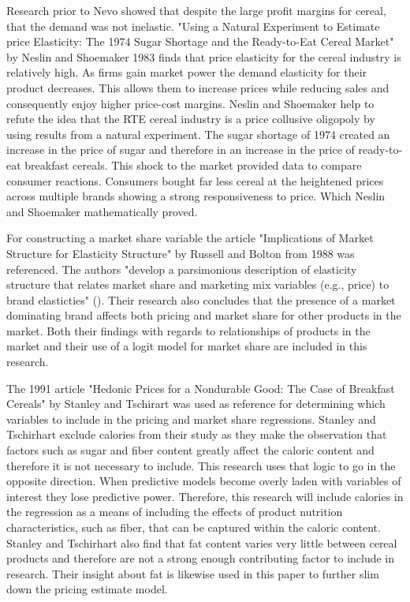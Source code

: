 \documentclass[12pt,english]{article}
\begin{document}
\tab Research prior to Nevo showed that despite the large profit margins for cereal, that the demand was not inelastic. "Using a Natural Experiment to Estimate price Elasticity: The 1974 Sugar Shortage and the Ready-to-Eat Cereal Market" by Neslin and Shoemaker 1983 finds that price elasticity for the cereal industry is relatively high. As firms gain market power the demand elasticity for their product decreases. This allows them to increase prices while reducing sales and consequently enjoy higher price-cost margins. Neslin and Shoemaker help to refute the idea that the RTE cereal industry is a price collusive oligopoly by using results from a natural experiment. The sugar shortage of 1974 created an increase in the price of sugar and therefore in an increase in the price of ready-to-eat breakfast cereals. This shock to the market provided data to compare consumer reactions. Consumers bought far less cereal at the heightened prices across multiple brands showing a strong responsiveness to price. Which Neslin and Shoemaker mathematically proved. 

\tab For constructing a market share variable the article "Implications of Market Structure for Elasticity Structure" by Russell and Bolton from 1988 was referenced. The authors "develop a parsimonious description of elasticity structure that relates market share and marketing mix variables (e.g., price) to brand elasticties" (\cite{RussellandBolton1988}). Their research also concludes that the presence of a market dominating brand affects both pricing and market share for other products in the market. Both their findings with regards to relationships of products in the market and their use of a logit model for market share are included in this research.

\tab The 1991 article "Hedonic Prices for a Nondurable Good: The Case of Breakfast Cereals" by Stanley and Tschirart was used as reference for determining which variables to include in the pricing and market share regressions. Stanley and Tschirhart exclude calories from their study as they make the observation that factors such as sugar and fiber content greatly affect the caloric content and therefore it is not necessary to include. This research uses that logic to go in the opposite direction. When predictive models become overly laden with variables of interest they lose predictive power. Therefore, this research will include calories in the regression as a means of including the effects of product nutrition characteristics, such as fiber, that can be captured within the caloric content. Stanley and Tschirhart also find that fat content varies very little between cereal products and therefore are not a strong enough contributing factor to include in research. Their insight about fat is likewise used in this paper to further slim down the pricing estimate model. 
\end{document}
